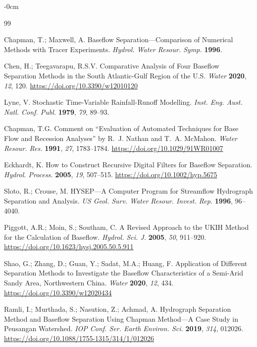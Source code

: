 \documentclass[hydrology,article,submit,pdftex,moreauthors]{Definitions/mdpi}
\begin{document}
\begin{adjustwidth}{-\extralength}{0cm}


\begin{thebibliography}{99}

Chapman, T.; Maxwell, A. Baseflow Separation---Comparison of Numerical Methods with Tracer Experiments. \textit{Hydrol. Water Resour. Symp.} \textbf{1996}.

Chen, H.; Teegavarapu, R.S.V. Comparative Analysis of Four Baseflow Separation Methods in the South Atlantic-Gulf Region of the U.S. \textit{Water} \textbf{2020}, \textit{12}, 120. \url{https://doi.org/10.3390/w12010120}

Lyne, V. Stochastic Time-Variable Rainfall-Runoff Modelling. \textit{Inst. Eng. Aust. Natl. Conf. Publ.} \textbf{1979}, \textit{79}, 89--93.

Chapman, T.G. Comment on ``Evaluation of Automated Techniques for Base Flow and Recession Analyses'' by R.~J. Nathan and T.~A. McMahon. \textit{Water Resour. Res.} \textbf{1991}, \textit{27}, 1783--1784. \url{https://doi.org/10.1029/91WR01007}

Eckhardt, K. How to Construct Recursive Digital Filters for Baseflow Separation. \textit{Hydrol. Process.} \textbf{2005}, \textit{19}, 507--515. \url{https://doi.org/10.1002/hyp.5675}

Sloto, R.; Crouse, M. HYSEP---A Computer Program for Streamflow Hydrograph Separation and Analysis. \textit{US Geol. Surv. Water Resour. Invest. Rep.} \textbf{1996}, 96--4040.

Piggott, A.R.; Moin, S.; Southam, C. A Revised Approach to the UKIH Method for the Calculation of Baseflow. \textit{Hydrol. Sci. J.} \textbf{2005}, \textit{50}, 911--920. \url{https://doi.org/10.1623/hysj.2005.50.5.911}

Shao, G.; Zhang, D.; Guan, Y.; Sadat, M.A.; Huang, F. Application of Different Separation Methods to Investigate the Baseflow Characteristics of a Semi-Arid Sandy Area, Northwestern China. \textit{Water} \textbf{2020}, \textit{12}, 434. \url{https://doi.org/10.3390/w12020434}

Ramli, I.; Murthada, S.; Nasution, Z.; Achmad, A. Hydrograph Separation Method and Baseflow Separation Using Chapman Method---A Case Study in Peusangan Watershed. \textit{IOP Conf. Ser. Earth Environ. Sci.} \textbf{2019}, \textit{314}, 012026. \url{https://doi.org/10.1088/1755-1315/314/1/012026}


\end{thebibliography}
\end{adjustwidth}
\end{document}
